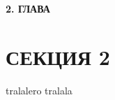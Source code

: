 \newpage
\begin{center}
  \textbf{\large 2. ГЛАВА}
\end{center}


\section{СЕКЦИЯ 2}
tralalero tralala